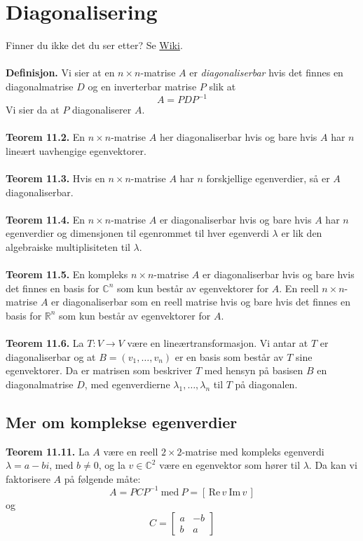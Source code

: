 \documentclass{article}
\begin{document}
\section{Diagonalisering}
Finner du ikke det du ser etter? Se \href{https://www.math.ntnu.no/emner/TMA4110/2020h/notater/11-diagonalisering.pdf}{Wiki}.
\\\\
\textbf{Definisjon.} Vi sier at en $n \times n$-matrise $A$ er \textit{diagonaliserbar} hvis det finnes en diagonalmatrise $D$ og en inverterbar matrise $P$ slik at
\[ A = PDP^{-1} \]
Vi sier da at $P$ diagonaliserer $A$.
\\\\
\textbf{Teorem 11.2.} En $n \times n$-matrise $A$ her diagonaliserbar hvis og bare hvis $A$ har $n$ lineært uavhengige egenvektorer.
\\\\
\textbf{Teorem 11.3.} Hvis en $n \times n$-matrise $A$ har $n$ forskjellige egenverdier, så er $A$ diagonaliserbar.
\\\\
\textbf{Teorem 11.4.} En $n \times n$-matrise $A$ er diagonaliserbar hvis og bare hvis $A$ har $n$ egenverdier og dimensjonen til egenrommet til hver egenverdi $\lambda$ er lik den algebraiske multiplisiteten til $\lambda$.
\\\\
\textbf{Teorem 11.5.} En kompleks $n \times n$-matrise $A$ er diagonaliserbar hvis og bare hvis det finnes en basis for $\mathbb{C}^n$ som kun består av egenvektorer for $A$. En reell $n \times n$-matrise $A$ er diagonaliserbar som en reell matrise hvis og bare hvis det finnes en basis for $\mathbb{R}^n$ som kun består av egenvektorer for $A$.
\\\\
\textbf{Teorem 11.6.} La $T: V \rightarrow V$ være en lineærtransformasjon. Vi antar at $T$ er diagonaliserbar og at $B = (v_1, \dots, v_n)$ er en basis som består av $T$ sine egenvektorer. Da er matrisen som beskriver $T$ med hensyn på basisen $B$ en diagonalmatrise $D$, med egenverdierne $\lambda_1, \dots, \lambda_n$ til $T$ på diagonalen.


\subsection{Mer om komplekse egenverdier}
\textbf{Teorem 11.11.} La $A$ være en reell $2 \times 2$-matrise med kompleks egenverdi $\lambda = a - bi$, med $b \neq 0$, og la $v \in \mathbb{C}^2$ være en egenvektor som hører til $\lambda$. Da kan vi faktorisere $A$ på følgende måte:
\[ A = PCP^{-1} \ \text{med} \ P = [\, \text{Re}\,v \ \text{Im}\,v\,] \]
og
\[ C = \begin{bmatrix}
    a & -b \\ b & a
\end{bmatrix} \]
\end{document}
